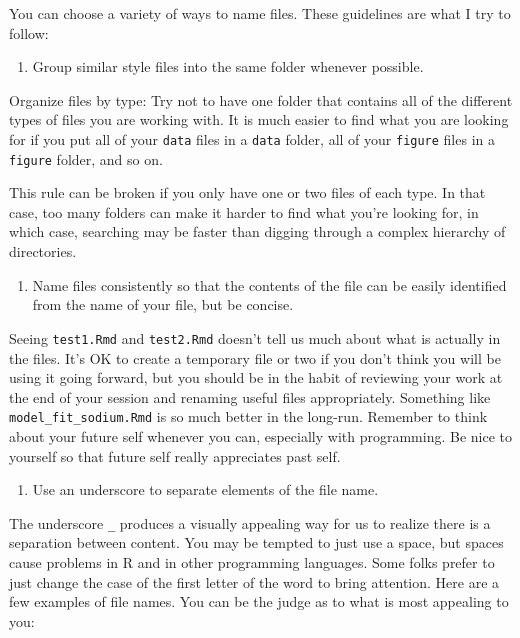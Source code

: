 \documentclass[]{tufte-book}
\providecommand{\tightlist}{%
  \setlength{\itemsep}{0pt}\setlength{\parskip}{0pt}}
\begin{document}
You can choose a variety of ways to name files. These guidelines are what I try to follow:

\begin{enumerate}
\def\labelenumi{\arabic{enumi}.}
\tightlist
\item
  Group similar style files into the same folder whenever possible.
\end{enumerate}

Organize files by type: Try not to have one folder that contains all of the
different types of files you are working with. It is much easier to find what you
are looking for if you put all of your \texttt{data} files in a \texttt{data} folder, all of
your \texttt{figure} files in a \texttt{figure} folder, and so on.

This rule can be broken if you only have one or two files of each type. In that
case, too many folders can make it harder to find what you're looking for, in which
case, searching may be faster than digging through a complex hierarchy of directories.

\begin{enumerate}
\def\labelenumi{\arabic{enumi}.}
\setcounter{enumi}{1}
\tightlist
\item
  Name files consistently so that the contents of the file can be easily
  identified from the name of your file, but be concise.
\end{enumerate}

Seeing \texttt{test1.Rmd} and \texttt{test2.Rmd} doesn't tell us much about what is actually
in the files. It's OK to create a temporary file or two if you don't think you
will be using it going forward, but you should be in the habit of reviewing your
work at the end of your session and renaming useful files appropriately.
Something like \texttt{model\_fit\_sodium.Rmd} is so much better in the long-run.
Remember to think about your future self whenever you can, especially with
programming. Be nice to yourself so that future self really appreciates past self.

\begin{enumerate}
\def\labelenumi{\arabic{enumi}.}
\setcounter{enumi}{2}
\tightlist
\item
  Use an underscore to separate elements of the file name.
\end{enumerate}

The underscore \texttt{\_} produces a visually appealing way for us to realize there is
a separation between content. You may be tempted to just use a space, but spaces
cause problems in R and in other programming languages. Some folks prefer to just
change the case of the first letter of the word to bring attention. Here are a few
examples of file names. You can be the judge as to what is most appealing to you:
\end{document}
